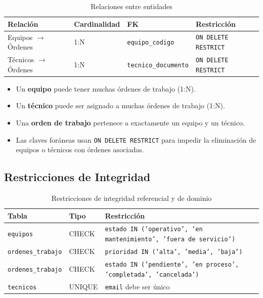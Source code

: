 \documentclass[12pt, a4paper]{article}
\begin{document}
\begin{table}[H]
    \centering
    \begin{tabularx}{\textwidth}{l l l X}
        \toprule
        \textbf{Relación} & \textbf{Cardinalidad} & \textbf{FK} & \textbf{Restricción} \\
        \midrule
        Equipos $\rightarrow$ Órdenes & 1:N & \texttt{equipo\_codigo} & \texttt{ON DELETE RESTRICT} \\
        Técnicos $\rightarrow$ Órdenes & 1:N & \texttt{tecnico\_documento} & \texttt{ON DELETE RESTRICT} \\
        \bottomrule
    \end{tabularx}
    \caption{Relaciones entre entidades}
\end{table}

\begin{itemize}[leftmargin=2em]
    \item Un \textbf{equipo} puede tener muchas órdenes de trabajo (1:N).
    \item Un \textbf{técnico} puede ser asignado a muchas órdenes de trabajo (1:N).
    \item Una \textbf{orden de trabajo} pertenece a exactamente un equipo y un técnico.
    \item Las claves foráneas usan \texttt{ON DELETE RESTRICT} para impedir la eliminación de equipos o técnicos con órdenes asociadas.
\end{itemize}

\subsection{Restricciones de Integridad}

\begin{table}[H]
    \centering
    \begin{tabularx}{\textwidth}{l l X}
        \toprule
        \textbf{Tabla} & \textbf{Tipo} & \textbf{Restricción} \\
        \midrule
        \texttt{equipos} & CHECK & \texttt{estado IN ('operativo', 'en mantenimiento', 'fuera de servicio')} \\
        \texttt{ordenes\_trabajo} & CHECK & \texttt{prioridad IN ('alta', 'media', 'baja')} \\
        \texttt{ordenes\_trabajo} & CHECK & \texttt{estado IN ('pendiente', 'en proceso', 'completada', 'cancelada')} \\
        \texttt{tecnicos} & UNIQUE & \texttt{email} debe ser único \\
        \bottomrule
    \end{tabularx}
    \caption{Restricciones de integridad referencial y de dominio}
\end{table}
\end{document}
